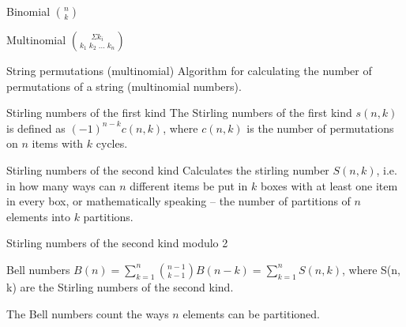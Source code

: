 

\begin{algorithm}{Binomial $\binom{n}{k}$}
\end{algorithm}

\begin{algorithm}{Multinomial $\binom{\Sigma k_i}{k_1\;k_2\;\ldots\;k_n}$}
\end{algorithm}

\begin{algorithm}{String permutations (multinomial)}
\desc
Algorithm for calculating the number of permutations of a string
(multinomial numbers).
\end{algorithm}

\begin{algorithm}{Stirling numbers of the first kind}
\desc
The Stirling numbers of the first kind $s(n,k)$ is defined as
$(-1)^{n-k}c(n,k)$, where $c(n,k)$ is the number of permutations on
$n$ items with $k$ cycles.
\end{algorithm}

\begin{algorithm}{Stirling numbers of the second kind}
\desc
Calculates the stirling number $S(n,k)$, i.e. in how many ways can $n$
different items be put in $k$ boxes with at least one item in every
box, or mathematically speaking -- the number of partitions of $n$
elements into $k$ partitions.
\end{algorithm}

\begin{algorithm}{Stirling numbers of the second kind modulo 2}
\end{algorithm}


\begin{algorithm}{Bell numbers}
\desc
$B(n) = \sum_{k=1}^n \binom{n-1}{k-1} B(n-k) = \sum_{k=1}^n S(n,k)$,
where S(n, k) are the Stirling numbers of the second kind.

The Bell numbers count the ways $n$ elements can be partitioned.
\end{algorithm}

